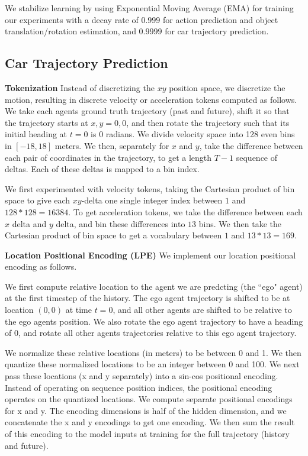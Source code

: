 We stabilize learning by using Exponential Moving Average (EMA) for training our experiments with a decay rate of $0.999$ for action prediction and object translation/rotation estimation, and $0.9999$ for car trajectory prediction.

\subsection{Car Trajectory Prediction}
\label{sec:appendix_car_impl_details}

\medskip \noindent \textbf{Tokenization} Instead of discretizing the $xy$ position space, we discretize the motion, resulting in discrete velocity or acceleration tokens computed as follows. We take each agents ground truth trajectory (past and future), shift it so that the trajectory starts at $x, y = 0, 0$, and then rotate the trajectory such that its initial heading at $t=0$ is $0$ radians. We divide velocity space into 128 even bins in $[-18, 18]$ meters. We then, separately for $x$ and $y$, take the difference between each pair of coordinates in the trajectory, to get a length $T-1$ sequence of deltas. Each of these deltas is mapped to a bin index. 

We first experimented with velocity tokens, taking the Cartesian product of bin space to give each $xy$-delta one single integer index between $1$ and $128*128 = 16384$. To get acceleration tokens, we take the difference between each $x$ delta and $y$ delta, and bin these differences into $13$ bins. We then take the Cartesian product of bin space to get a vocabulary between $1$ and $13*13=169$.

\medskip \noindent \textbf{Location Positional Encoding (LPE)} 
We implement our location positional encoding as follows. 

We first compute relative location to the agent we are predcting (the ``ego" agent) at the first timestep of the history. The ego agent trajectory is shifted to be at location $(0,0)$ at time $t=0$, and all other agents are shifted to be relative to the ego agents position. We also rotate the ego agent trajectory to have a heading of 0, and rotate all other agents trajectories relative to this ego agent trajectory. 

We normalize these relative locations (in meters) to be between 0 and 1. We then quantize these normalized locations to be an integer between 0 and 100. We next pass these locations (x and y separately) into a sin-cos positional encoding. Instead of operating on sequence position indices, the positional encoding operates on the quantized locations. We compute separate positional encodings for x and y. The encoding dimensions is half of the hidden dimension, and we concatenate the x and y encodings to get one encoding. We then sum the result of this encoding to the model inputs at training for the full trajectory (history and future).

